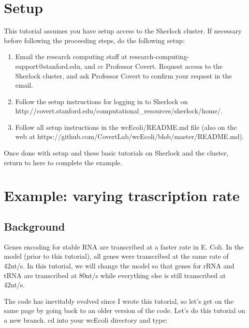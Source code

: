 \documentclass[12pt]{article}
\begin{document}
\section{Setup}
\label{sec:setup}

This tutorial assumes you have setup access to the Sherlock cluster. If necessary before following the proceeding steps, do the following setup:

\begin{enumerate}
\item Email the research computing staff at research-computing-support@stanford.edu, and cc Professor Covert. Request access to the Sherlock cluster, and ask Professor Covert to confirm your request in the email.

\item Follow the setup instructions for logging in to Sherlock on
\linebreak
http://covert.stanford.edu/computational\_resources/sherlock/home/.

\item Follow all setup instructions in the wcEcoli/README.md file (also on the web at https://github.com/CovertLab/wcEcoli/blob/master/README.md).
\end{enumerate}

Once done with setup and these basic tutorials on Sherlock and the cluster, return to here to complete the example.



\section{Example: varying trascription rate}

\subsection{Background}

Genes encoding for stable RNA are transcribed at a faster rate in E. Coli. In the model (prior to this tutorial), all genes were transcribed at the same rate of 42nt/s. In this tutorial, we will change the model so that genes for rRNA and tRNA are transcribed at 80nt/s while everything else is still transcribed at 42nt/s. 
\par

The code has inevitably evolved since I wrote this tutorial, so let’s get on the same page by going back to an older version of the code. Let’s do this tutorial on a new branch. cd into your wcEcoli directory and type:
\end{document}
